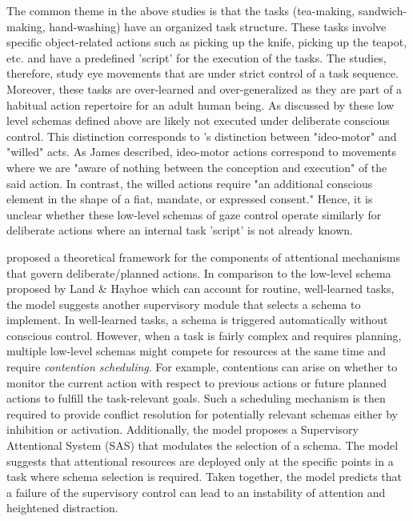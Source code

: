 The common theme in the above studies is that the tasks (tea-making, sandwich-making, hand-washing) have an organized task structure. These tasks involve specific object-related actions such as picking up the knife, picking up the teapot, etc. and have a predefined 'script' for the execution of the tasks. The studies, therefore, study eye movements that are under strict control of a task sequence. Moreover, these tasks are over-learned and over-generalized as they are part of a habitual action repertoire for an adult human being. As discussed by \citet{Land2006-da} these low level schemas defined above are likely not executed under deliberate conscious control. This distinction corresponds to \citet{james2007principles}'s distinction between "ideo-motor" and "willed" acts. As James described, ideo-motor actions correspond to movements where we are "aware of nothing between the conception and execution" of the said action. In contrast, the willed actions require "an additional conscious element in the shape of a fiat, mandate, or expressed consent." Hence, it is unclear whether these low-level schemas of gaze control operate similarly for deliberate actions where an internal task 'script' is not already known.

\citet{Norman1986-qb} proposed a theoretical framework for the components of attentional mechanisms that govern deliberate/planned actions. In comparison to the low-level schema proposed by Land \& Hayhoe which can account for routine, well-learned tasks, the \citet{Norman1986-qb} model suggests another supervisory module that selects a schema to implement. In well-learned tasks, a schema is triggered automatically without conscious control. However, when a task is fairly complex and requires planning, multiple low-level schemas might compete for resources at the same time and require \emph{contention scheduling}. For example, contentions can arise on whether to monitor the current action with respect to previous actions or future planned actions to fulfill the task-relevant goals. Such a scheduling mechanism is then required to provide conflict resolution for potentially relevant schemas either by inhibition or activation. Additionally, the model proposes a Supervisory Attentional System (SAS) that modulates the selection of a schema. The model suggests that attentional resources are deployed only at the specific points in a task where schema selection is required. Taken together, the model predicts that a failure of the supervisory control can lead to an instability of attention and heightened distraction.

